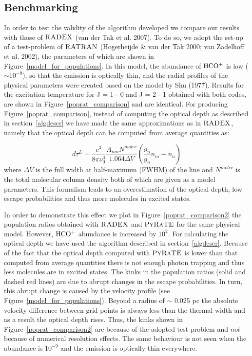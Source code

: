 \documentclass{mn2e}
\begin{document}
\subsection{Benchmarking}

In order to test the validity of the algorithm developed we compare our results with those of $\textsc{RADEX}$ (van der Tak et al. 2007). To do so, we adopt the set-up of a test-problem of $\textsc{RATRAN}$ (Hogerheijde \& van der Tak 2000; van Zadelhoff et al. 2002), the parameters of which are shown in Figure~\ref{model_for_populations}. In this model, the abundance of $\rm{HCO^{+}}$ is low ($\sim 10^{-9}$), so that the emission is optically thin, and the radial profiles of the physical parameters were created based on the model by Shu (1977). Results for the excitation temperature for J = 1 - 0 and J = 2 - 1 obtained with both codes, are shown in Figure~\ref{poprat_comparison} and are identical. For producing Figure~\ref{poprat_comparison}, instead of computing the optical depth as described in section~\ref{algdescr} we have made the same approximations as in $\textsc{RADEX}$, namely that the optical depth can be computed from average quantities as:

\begin{equation}\label{dtau}
d\tau^L=\frac{c^3}{8\pi \nu_{0}^3}\frac{A_{nm}N^{molec}}{1.064\Delta V}(\frac{g_n}{g_n}n_m-n_n)
\end{equation}
where $\Delta V$ is the full width at half-maximum (FWHM) of the line and $N^{molec}$ is the total molecular column density both of which are given as a model parameters. This formalism leads to an overestimation of the optical depth, low escape probabilities and thus more molecules in excited states.

In order to demonstrate this effect we plot in Figure~\ref{poprat_comparison2} the population ratios obtained with $\textsc{RADEX}$ and $\textsc{PyRaTE}$ for the same physical model. However, $\rm{HCO^+}$ abundance is increased by $10^2$. For calculating the optical depth we have used the algorithm described in section~\ref{algdescr}. Because of the fact that the optical depth computed with $\textsc{PyRaTE}$ is lower than that computed from average quantities there is not enough photon trapping and thus less molecules are in excited states. The kinks in the population ratios (solid and dashed red lines) are due to abrupt changes in the escape probabilities. In turn, this abrupt change is caused by the velocity profile (see Figure~\ref{model_for_populations}). Beyond a radius of $\sim$ 0.025 pc the absolute velocity difference between grid points is always less than the thermal width and as a result the optical depth rises. Thus, the kinks shown in Figure~\ref{poprat_comparison2} are because of the adopted test problem and $\textit{not}$ because of numerical resolution effects. The same behaviour is not seen when the abundance is $10^{-9}$ and the emission is optically thin everywhere.
\end{document}
